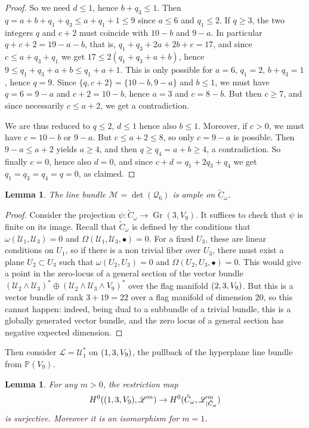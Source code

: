 \documentclass[JEP,XML,SOM,Unicode,NoEqCountersInSection]{cedram}
\newcommand{\NoChangel}[1]{%
\expandafter\let\csname old\string#1\endcsname=#1
\let#1=\relax
\newcommand{#1}{\mathcode`l="716C\csname old\string#1\endcsname\mathcode`l="7160 }%
}
\newcommand{\sbullet}{{\scriptstyle\bullet}}
\let\mathcal\mathscr
\theoremstyle{plain}
\newtheorem{lemma}[theorem]{Lemma}
\theoremstyle{definition}
\DeclareMathOperator{\Gr}{Gr}
\DeclareMathOperator{\Fl}{Fl}\NoChangel{\Fl}
\newcommand{\PP}{\mathbb{P}}
\newcommand{\sheaf}[1]{\mathcal{#1}}
\newcommand{\kl}{\sheaf{L}}
\newcommand{\km}{\sheaf{M}}
\newcommand{\kq}{\sheaf{Q}}
\newcommand{\ku}{\sheaf{U}}
\begin{document}
\begin{proof}
So we need $d\le 1$, hence $b+q_3\le 1$. Then $q=a+b+q_1+q_3\le a+q_1+1\le 9$ since $a\le 6$ and
$q_1\le 2$. If $q\ge 3$, the two integers $q$ and $c+2$ must coincide with $10-b$ and $9-a$.
In particular $q+c+2=19-a-b$, that is, $q_1+q_3+2a+2b+c=17$, and since $c\le a+q_3+q_1$ we get
$17\le 2(q_1+q_3+a+b)$, hence $9\le q_1+q_3+a+b\le q_1+a+1$. This is only possible for $a=6$,
$q_1=2$, $b+q_3=1$, hence $q=9$. Since $\{q,c+2\}=\{10-b,9-a\}$ and $b\le 1$, we must have
$q=6=9-a$ and $c+2=10-b$, hence $a=3$ and $c=8-b$. But then $c\ge 7$, and since necessarily
$c\le a+2$, we get a contradiction.

We are thus reduced to $q\le 2$, $d\le 1$ hence also $b\le 1$. Moreover, if $c>0$, we must have
$c=10-b$ or $9-a$.
But $c\le a+2\le 8$, so only $c=9-a$ is possible. Then $9-a\le a+2$ yields $a\ge 4$,
and then $q\ge q_4=a+b\ge 4$, a contradiction. So finally $c=0$, hence also $d=0$, and since $c+d=q_1+2q_3+q_4$ we get $q_1=q_3=q_4=q=0$, as claimed.
\end{proof}

\begin{lemma}\label{ampleness}
The line bundle $\km=\det(\kq_6)$ is ample on $\tilde C_\omega$.
\end{lemma}

\begin{proof}
Consider the projection $\psi : \tilde C_\omega\to \Gr(3,V_9)$. It suffices to check that $\psi$
is finite on its image. Recall that $\tilde C_\omega$ is defined by the conditions that $\omega(\ku_1,\ku_3)=0$ and
$\Omega(\ku_1,\ku_3,\sbullet)=0$. For a fixed $U_3$, these are linear conditions on $U_1$, so if there is a non
trivial fiber over $U_3$, there must exist a plane $U_2\subset U_3$ such that $\omega(U_2,U_3)=0$ and
$\Omega(U_2,U_3,\sbullet)=0$. This would give a point in the zero-locus of a general section of the vector bundle
$(\ku_2\wedge \ku_3)^*\oplus (\ku_2\wedge \ku_3\wedge V_9)^*$ over the flag manifold $\Fl(2,3,V_9)$. But this is
a vector bundle of rank $3+19=22$ over a flag manifold of dimension $20$, so this cannot happen: indeed,
being dual to a subbundle of a trivial bundle, this is a globally generated vector bundle, and
the zero locus of a general section has negative expected dimension.
\end{proof}

Then consider $\kl = \ku_1^*$ on $\Fl(1,3,V_9)$, the pullback of the hyperplane line bundle from $\PP (V_9)$.

\begin{lemma}\label{projnorm}
For any $m>0$, the restriction map \[
H^0(\Fl(1,3,V_9),\kl^m)\to H^0(\tilde C_\omega,\kl_{|\tilde C_\omega}^m)
\] is surjective.
Moreover it is an isomorphism for $m=1$.
\end{lemma}
\end{document}
